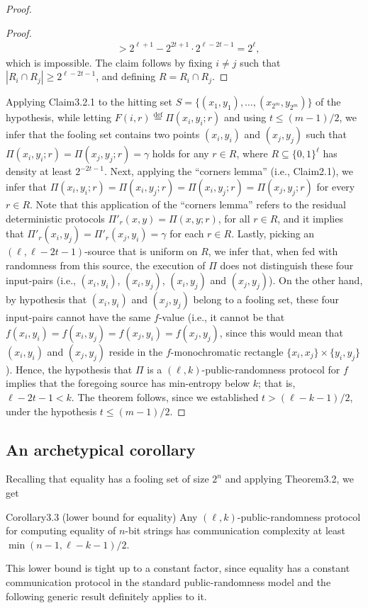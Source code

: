 \begin{proof}
\begin{proof}
\begin{align*}
&>2^{\ell+1}-2^{2t+1}\cdot2^{\ell-2t-1}=2^\ell,
\end{align*}
which is impossible. The claim follows by fixing $i\ne j$ such that $|R_i\cap R_j|\ge2^{\ell-2t-1}$, and defining $R=R_i\cap R_j$.
\end{proof}
Applying Claim3.2.1 to the hitting set $S=\{(x_1,y_1),\ldots,(x_{2^m},y_{2^m})\}$ of the hypothesis, while letting $F(i,r)\stackrel{\mathrm{def}}=\Pi(x_i,y_i;r)$ and using $t\le(m-1)/2$, we infer that the fooling set contains two points $(x_i,y_i)$ and $(x_j,y_j)$ such that $\Pi(x_i,y_i;r)=\Pi(x_j,y_j;r)=\gamma$ holds for any $r\in R$, where $R\subseteq\{0,1\}^\ell$ has density at least $2^{-2t-1}$.
Next, applying the ``corners lemma'' (i.e., Claim2.1), we infer that $\Pi(x_i,y_i;r)=\Pi(x_i,y_j;r)=\Pi(x_i,y_j;r)=\Pi(x_j,y_j;r)$ for every $r\in R$. Note that this application of the ``corners lemma'' refers to the residual deterministic protocols $\Pi'_r(x,y)=\Pi(x,y;r)$, for all $r\in R$, and it implies that $\Pi'_r(x_i,y_j)=\Pi'_r(x_j,y_i)=\gamma$ for each $r\in R$.
Lastly, picking an $(\ell,\ell-2t-1)$-source that is uniform on $R$, we infer that, when fed with randomness from this source, the execution of $\Pi$ does not distinguish these four input-pairs (i.e., $(x_i,y_i)$, $(x_i,y_j)$, $(x_i,y_j)$ and $(x_j,y_j)$). On the other hand, by hypothesis that $(x_i,y_i)$ and $(x_j,y_j)$ belong to a fooling set, these four input-pairs cannot have the same $f$-value (i.e., it cannot be that $f(x_i,y_i)=f(x_i,y_j)=f(x_j,y_i)=f(x_j,y_j)$, since this would mean that $(x_i,y_i)$ and $(x_j,y_j)$ reside in the $f$-monochromatic rectangle $\{x_i,x_j\}\times\{y_i,y_j\}$). Hence, the hypothesis that $\Pi$ is a $(\ell,k)$-public-randomness protocol for $f$ implies that the foregoing source has min-entropy below $k$; that is, $\ell-2t-1<k$. The theorem follows, since we established $t>(\ell-k-1)/2$, under the hypothesis $t\le(m-1)/2$.
\end{proof}
\subsection*{An archetypical corollary}
Recalling that equality has a fooling set of size $2^n$ and applying Theorem3.2, we get
\begin{authorclaim}{Corollary3.3 (lower bound for equality)}
Any $(\ell,k)$-public-randomness protocol for computing equality of $n$-bit strings has communication complexity at least $\min(n-1,\ell-k-1)/2$.
\end{authorclaim}
This lower bound is tight up to a constant factor, since equality has a constant communication protocol in the standard public-randomness model and the following generic result definitely applies to it.

